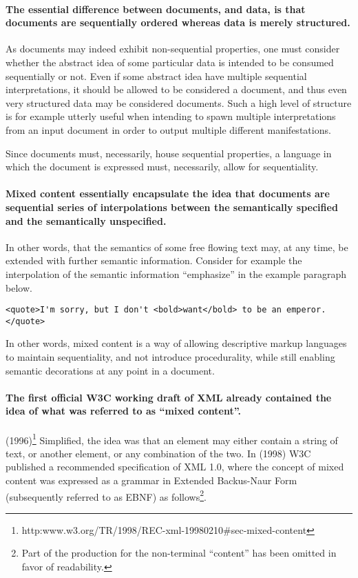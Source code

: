 \documentclass{scrreprt}
\begin{document}
\paragraph{The essential difference between documents, and data, is that documents are sequentially ordered whereas data is merely structured.} As documents may indeed exhibit non-sequential properties, one must consider whether the abstract idea of some particular data is intended to be consumed sequentially or not. Even if some abstract idea have multiple sequential interpretations, it should be allowed to be considered a document, and thus even very structured data may be considered documents. Such a high level of structure is for example utterly useful when intending to spawn multiple interpretations from an input document in order to output multiple different manifestations.

Since documents must, necessarily, house sequential properties, a language in which the document is expressed must, necessarily, allow for sequentiality.

\paragraph{Mixed content essentially encapsulate the idea that documents are sequential series of interpolations between the semantically specified and the semantically unspecified.} In other words, that the semantics of some free flowing text may, at any time, be extended with further semantic information. Consider for example the interpolation of the semantic information ``emphasize'' in the example paragraph below.

\begin{lstlisting}
<quote>I'm sorry, but I don't <bold>want</bold> to be an emperor.</quote>
\end{lstlisting}

In other words, mixed content is a way of allowing descriptive markup languages to maintain sequentiality, and not introduce procedurality, while still enabling semantic decorations at any point in a document.


\paragraph{The first official W3C working draft of XML already contained the idea of what was referred to as ``mixed content''.}(1996)\footnote{http:\/\/www.w3.org/TR/1998/REC-xml-19980210\#sec-mixed-content} Simplified, the idea was that an element may either contain a string of text, or another element, or any combination of the two. In (1998) W3C published a recommended specification of XML 1.0, where the concept of mixed content was expressed as a grammar in Extended Backus-Naur Form (subsequently referred to as EBNF) as follows\footnote{Part of the production for the non-terminal ``content'' has been omitted in favor of readability.}.
\end{document}
